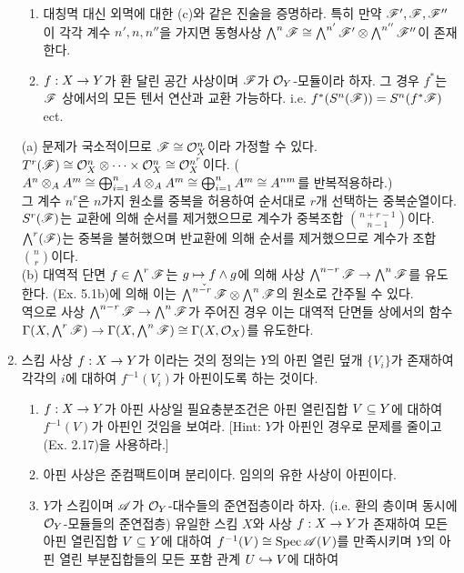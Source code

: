 \begin{enumerate}[label=\tb{5.\arabic*.},itemindent=0mm,itemsep=4mm]
\begin{enumerate}[label=(\alph*)]
	\item 대칭멱 대신 외멱에 대한 (c)와 같은 진술을 증명하라.
	특히 만약 $\mathscr{F}',\mathscr{F},\mathscr{F}''$이 각각 계수 $n',n,n''$을 가지면
	동형사상 $\bigwedge^n\mathscr{F}\cong\bigwedge^{n'}\mathscr{F}'\otimes\bigwedge^{n''}\mathscr{F}''$이 존재한다.
	\item $f:X\rightarrow Y$가 환 달린 공간 사상이며 $\mathscr{F}$가 $\mathcal{O}_Y$-모듈이라 하자.
	그 경우 $f^*$는 $\mathscr{F}$ 상에서의 모든 텐서 연산과 교환 가능하다.
	i.e. $f^*(S^n(\mathscr{F}))=S^n(f^*\mathscr{F})$ ect.
	\end{enumerate}
	\sol (a) 문제가 국소적이므로 $\mathscr{F}\cong\mathcal{O}_X^n$이라 가정할 수 있다.
	$T^r(\mathscr{F})\cong\mathcal{O}_X^n\otimes\cdots\times\mathcal{O}_X^n\cong\mathcal{O}_X^{n^r}$이다.
	($A^n\otimes_AA^m\cong\bigoplus_{i=1}^nA\otimes_AA^m\cong\bigoplus_{i=1}^nA^m\cong A^{nm}$를 반복적용하라.)\\
	그 계수 $n^r$은 $n$가지 원소를 중복을 허용하여 순서대로 $r$개 선택하는 중복순열이다.\\
	$S^r(\mathscr{F})$는 교환에 의해 순서를 제거했으므로 계수가 중복조합 $\binom{n+r-1}{n-1}$이다.\\
	$\bigwedge^r(\mathscr{F})$는 중복을 불허했으며 반교환에 의해 순서를 제거했으므로 계수가 조합 $\binom nr$이다.\\
	(b) 대역적 단면 $f\in\bigwedge^r\mathscr{F}$는 $g\mapsto f\wedge g$에 의해 사상 $\bigwedge^{n-r}\mathscr{F}\rightarrow\bigwedge^n\mathscr{F}$를 유도한다.
	(Ex. 5.1b)에 의해 이는 $\check{\bigwedge^{n-r}\mathscr{F}}\otimes\bigwedge^n\mathscr{F}$의 원소로 간주될 수 있다.\\
	역으로 사상 $\bigwedge^{n-r}\mathscr{F}\rightarrow\bigwedge^n\mathscr{F}$가 주어진 경우
	이는 대역적 단면들 상에서의 함수 $\Gamma(X,\bigwedge^r\mathscr{F})\rightarrow\Gamma(X,\bigwedge^n\mathscr{F})\cong\Gamma(X,\mathcal{O}_X)$를 유도한다.
	\item {} 스킴 사상 $f:X\rightarrow Y$가 이라는 것의 정의는
	$Y$의 아핀 열린 덮개 $\{V_i\}$가 존재하여 각각의 $i$에 대하여 $f^{-1}(V_i)$가 아핀이도록 하는 것이다.
	\begin{enumerate}[label=(\alph*)]
		\item $f:X\rightarrow Y$가 아핀 사상일 필요충분조건은  아핀 열린집합 $V\subseteq Y$에 대하여 $f^{-1}(V)$가 아핀인 것임을 보여라.
		[Hint: $Y$가 아핀인 경우로 문제를 줄이고 (Ex. 2.17)을 사용하라.]
		\item 아핀 사상은 준컴팩트이며 분리이다. 임의의 유한 사상이 아핀이다.
		\item $Y$가 스킴이며 $\mathscr{A}$가 $\mathcal{O}_Y$-대수들의 준연접층이라 하자.
		(i.e. 환의 층이며 동시에 $\mathcal{O}_Y$-모듈들의 준연접층)
		유일한 스킴 $X$와 사상 $f:X\rightarrow Y$가 존재하여 모든 아핀 열린집합 $V\subseteq Y$에 대하여 $f^{-1}(V)\cong\operatorname{Spec}\mathscr{A}(V)$를 만족시키며
		$Y$의 아핀 열린 부분집합들의 모든 포함 관계 $U\hookrightarrow V$에 대하여

\end{enumerate}
\end{enumerate}
